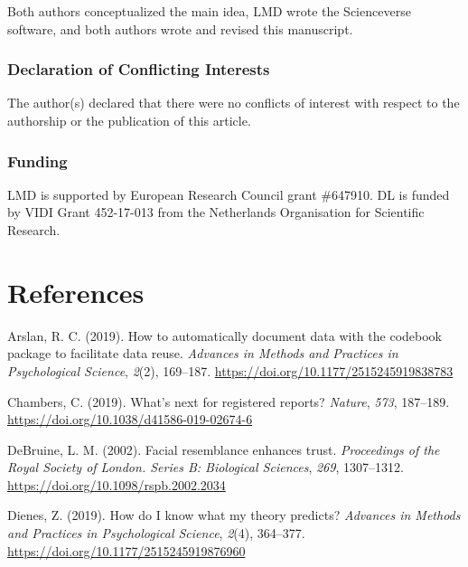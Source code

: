 \documentclass[english,doc,floatsintext]{apa6}
\begin{document}
Both authors conceptualized the main idea, LMD wrote the Scienceverse software, and both authors wrote and revised this manuscript.

\hypertarget{declaration-of-conflicting-interests}{%
\subsubsection{Declaration of Conflicting Interests}\label{declaration-of-conflicting-interests}}

The author(s) declared that there were no conflicts of interest with respect to the authorship or the publication of this article.

\hypertarget{funding}{%
\subsubsection{Funding}\label{funding}}

LMD is supported by European Research Council grant \#647910. DL is funded by VIDI Grant 452-17-013 from the Netherlands Organisation for Scientific Research.

\newpage

\hypertarget{references}{%
\section{References}\label{references}}

\begingroup
\setlength{\parindent}{-0.5in}
\setlength{\leftskip}{0.5in}

\hypertarget{refs}{}
\leavevmode\hypertarget{ref-arslan2019}{}%
Arslan, R. C. (2019). How to automatically document data with the codebook package to facilitate data reuse. \emph{Advances in Methods and Practices in Psychological Science}, \emph{2}(2), 169--187. \url{https://doi.org/10.1177/2515245919838783}

\leavevmode\hypertarget{ref-chambers2019}{}%
Chambers, C. (2019). What's next for registered reports? \emph{Nature}, \emph{573}, 187--189. \url{https://doi.org/10.1038/d41586-019-02674-6}

\leavevmode\hypertarget{ref-debruine2002}{}%
DeBruine, L. M. (2002). Facial resemblance enhances trust. \emph{Proceedings of the Royal Society of London. Series B: Biological Sciences}, \emph{269}, 1307--1312. \url{https://doi.org/10.1098/rspb.2002.2034}

\leavevmode\hypertarget{ref-dienes2019}{}%
Dienes, Z. (2019). How do I know what my theory predicts? \emph{Advances in Methods and Practices in Psychological Science}, \emph{2}(4), 364--377. \url{https://doi.org/10.1177/2515245919876960}
\end{document}
